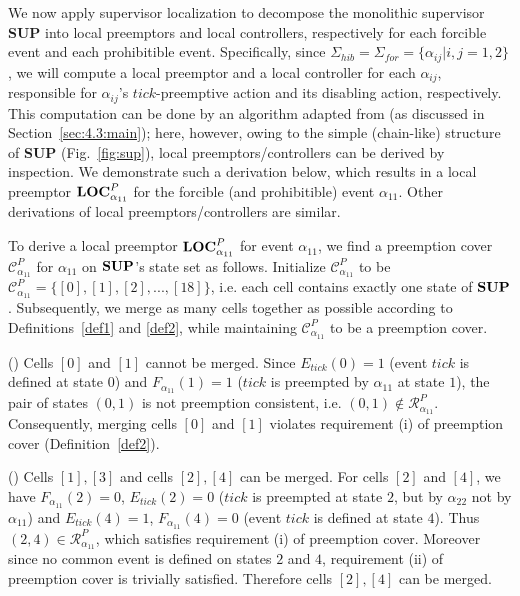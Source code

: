 \documentclass[twocolumn]{autart}
\newcommand{\rmnum}[1]{\romannumeral #1}
\begin{document}
We now apply supervisor localization to decompose the monolithic
supervisor {\bf SUP} into local preemptors and local controllers,
respectively for each forcible event and each prohibitible event.
Specifically, since $\Sigma_{hib}=\Sigma_{for} = \{\alpha_{ij}|i,j =
1,2\}$, we will compute a local preemptor and a local controller for
each $\alpha_{ij}$, responsible for $\alpha_{ij}$'s
$tick$-preemptive action and its disabling action, respectively.
This computation can be done by an algorithm adapted from
\cite{CaiWonham:2010a} (as discussed in Section~\ref{sec:4.3:main});
here, however, owing to the simple (chain-like) structure of {\bf
SUP} (Fig.~\ref{fig:sup}), local preemptors/controllers can be
derived by inspection. We demonstrate such a derivation below, which
results in a local preemptor ${\bf LOC}^P_{\alpha_{11}}$ for the
forcible (and prohibitible) event $\alpha_{11}$.  Other derivations
of local preemptors/controllers are similar.

To derive a local preemptor ${\bf LOC}^P_{\alpha_{11}}$ for event
$\alpha_{11}$, we find a preemption cover $\mathcal
{C}^P_{\alpha_{11}}$ for $\alpha_{11}$ on $\bf SUP$'s state set as
follows.  Initialize $\mathcal {C}^P_{\alpha_{11}}$ to be $\mathcal
{C}^P_{\alpha_{11}} = \big\{[0], [1], [2], ..., [18]\big\}$, i.e.
each cell contains exactly one state of $\bf SUP$.  Subsequently,
we merge as many cells together as possible according to
Definitions~\ref{def1} and \ref{def2}, while maintaining $\mathcal
{C}^P_{\alpha_{11}}$ to be a preemption cover.

(\rmnum{1}) Cells $[0]$ and $[1]$ cannot be merged. Since
$E_{tick}(0)=1$ (event $tick$ is defined at state $0$) and
$F_{\alpha_{11}}(1)=1$ ($tick$ is preempted by $\alpha_{11}$ at
state $1$), the pair of states $(0,1)$ is not preemption consistent,
i.e. $(0,1) \notin \mathcal{R}^P_{\alpha_{11}}$. Consequently,
merging cells $[0]$ and $[1]$ violates requirement (i) of preemption
cover (Definition~\ref{def2}).

(\rmnum{2}) Cells $[1], [3]$ and cells $[2], [4]$ can be merged. For
cells $[2]$ and $[4]$, we have $F_{\alpha_{11}}(2)=0$, $E_{tick}(2) = 0$ ($tick$ is
preempted at state $2$, but by $\alpha_{22}$ not by $\alpha_{11}$)
and $E_{tick}(4)=1$, $F_{\alpha_{11}}(4) = 0$ (event $tick$ is defined at state $4$). Thus
$(2,4) \in \mathcal{R}^P_{\alpha_{11}}$, which satisfies requirement
(i) of preemption cover.  Moreover since no common event is defined
on states $2$ and $4$, requirement (ii) of preemption cover is
trivially satisfied. Therefore cells $[2], [4]$ can be merged.
\end{document}
